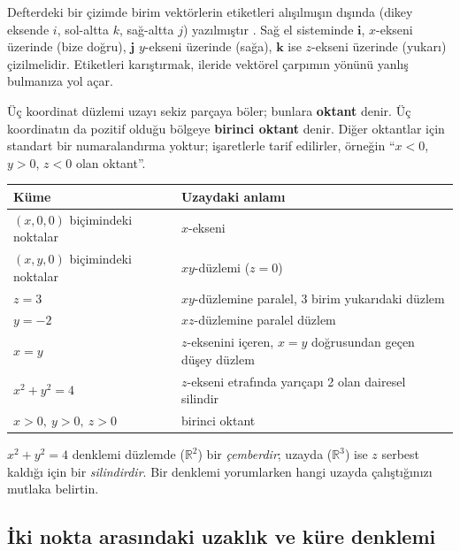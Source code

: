 \begin{dikkat}
Defterdeki bir çizimde birim vektörlerin etiketleri alışılmışın dışında (dikey eksende $i$, sol-altta $k$, sağ-altta $j$) yazılmıştır . Sağ el sisteminde $\mathbf i$, $x$-ekseni üzerinde (bize doğru), $\mathbf j$ $y$-ekseni üzerinde (sağa), $\mathbf k$ ise $z$-ekseni üzerinde (yukarı) çizilmelidir. Etiketleri karıştırmak, ileride vektörel çarpımın yönünü yanlış bulmanıza yol açar.
\end{dikkat}

Üç koordinat düzlemi uzayı sekiz parçaya böler; bunlara \textbf{oktant} denir. Üç koordinatın da pozitif olduğu bölgeye \textbf{birinci oktant} denir. Diğer oktantlar için standart bir numaralandırma yoktur; işaretlerle tarif edilirler, örneğin ``$x<0$, $y>0$, $z<0$ olan oktant''.

\begin{center}
\begin{tabular}{l l}
\toprule
Küme & Uzaydaki anlamı \\
\midrule
$(x,0,0)$ biçimindeki noktalar & $x$-ekseni \\
$(x,y,0)$ biçimindeki noktalar & $xy$-düzlemi ($z=0$) \\
$z=3$ & $xy$-düzlemine paralel, 3 birim yukarıdaki düzlem \\
$y=-2$ & $xz$-düzlemine paralel düzlem \\
$x=y$ & $z$-eksenini içeren, $x=y$ doğrusundan geçen düşey düzlem \\
$x^2+y^2=4$ & $z$-ekseni etrafında yarıçapı 2 olan dairesel silindir \\
$x>0,\ y>0,\ z>0$ & birinci oktant \\
\bottomrule
\end{tabular}
\end{center}

\begin{dikkat}
$x^2+y^2=4$ denklemi düzlemde ($\mathbb{R}^2$) bir \emph{çemberdir}; uzayda ($\mathbb{R}^3$) ise $z$ serbest kaldığı için bir \emph{silindirdir}. Bir denklemi yorumlarken hangi uzayda çalıştığınızı mutlaka belirtin.
\end{dikkat}

\subsection{İki nokta arasındaki uzaklık ve küre denklemi}

